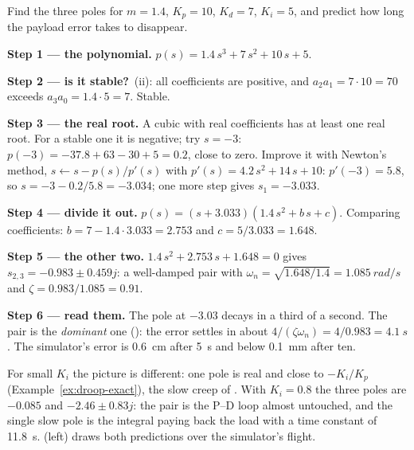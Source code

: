 \begin{example}[The poles of the loop with $K_i = 5$]
\label{ex:integral-poles}
Find the three poles for $m = 1.4$, $K_p = 10$, $K_d = 7$, $K_i = 5$, and predict how long the payload error takes to disappear.

\textbf{Step 1 — the polynomial.} $p(s) = 1.4\,s^3 + 7\,s^2 + 10\,s + 5$.

\textbf{Step 2 — is it stable?} \,(ii): all coefficients are positive, and $a_2a_1 = 7 \cdot 10 = 70$ exceeds $a_3a_0 = 1.4 \cdot 5 = 7$. Stable.

\textbf{Step 3 — the real root.} A cubic with real coefficients has at least one real root. For a stable one it is negative; try $s = -3$: $p(-3) = -37.8 + 63 - 30 + 5 = 0.2$, close to zero. Improve it with Newton's method, $s \leftarrow s - p(s)/p'(s)$ with $p'(s) = 4.2\,s^2 + 14\,s + 10$: $p'(-3) = 5.8$, so $s = -3 - 0.2/5.8 = -3.034$; one more step gives $s_1 = -3.033$.

\textbf{Step 4 — divide it out.} $p(s) = (s + 3.033)(1.4\,s^2 + b\,s + c)$. Comparing coefficients: $b = 7 - 1.4 \cdot 3.033 = 2.753$ and $c = 5/3.033 = 1.648$.

\textbf{Step 5 — the other two.} $1.4\,s^2 + 2.753\,s + 1.648 = 0$ gives $s_{2,3} = -0.983 \pm 0.459j$: a well-damped pair with $\omega_n = \sqrt{1.648/1.4} = \SI{1.085}{rad/s}$ and $\zeta = 0.983/1.085 = 0.91$.

\textbf{Step 6 — read them.} The pole at $-3.03$ decays in a third of a second. The pair is the \emph{dominant} one (): the error settles in about $4/(\zeta\omega_n) = 4/0.983 = \SI{4.1}{s}$. The simulator's error is \SI{0.6}{cm} after \SI{5}{s} and below \SI{0.1}{mm} after ten.
\end{example}

For small $K_i$ the picture is different: one pole is real and close to $-K_i/K_p$ (Example~\ref{ex:droop-exact}), the slow creep of . With $K_i = 0.8$ the three poles are $-0.085$ and $-2.46 \pm 0.83j$: the pair is the P–D loop almost untouched, and the single slow pole is the integral paying back the load with a time constant of \SI{11.8}{s}.  (left) draws both predictions over the simulator's flight.


